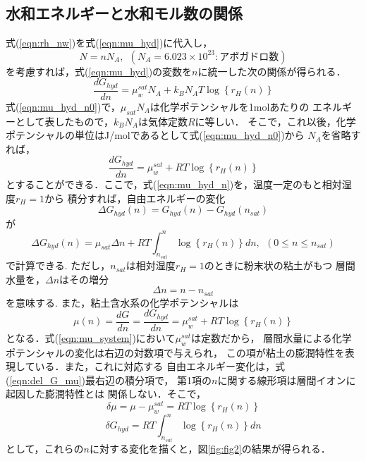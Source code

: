 \subsection{水和エネルギーと水和モル数の関係}
式(\ref{eqn:rh_nw})を式(\ref{eqn:mu_hyd})に代入し，
\begin{equation}
	N=nN_A, \ \ (N_A=6.023\times 10^{23}:アボガドロ数)
	\label{eqn:}
\end{equation}
を考慮すれば，式(\ref{eqn:mu_hyd})の変数を\(n\)に統一した次の関係が得られる．
\begin{equation}
	\frac{d G_{hyd}}{d n}
	=
	\mu_w^{sat}N_A +k_BN_AT \log \left\{ r_H(n) \right\}
	\label{eqn:mu_hyd_n0}
\end{equation}
式(\ref{eqn:mu_hyd_n0})で，\(\mu_{sat}N_A\)は化学ポテンシャルを1molあたりの
エネルギーとして表したもので，\(k_B N_A\)は気体定数\(R\)に等しい．
そこで，これ以後，化学ポテンシャルの単位はJ/molであるとして式(\ref{eqn:mu_hyd_n0})から
\(N_A\)を省略すれば，
\begin{equation}
	\frac{d G_{hyd}}{d n}
	=
	\mu_w^{sat} +RT \log \left\{ r_H(n) \right\}
	\label{eqn:mu_hyd_n}
\end{equation}
とすることができる．ここで，式(\ref{eqn:mu_hyd_n})を，温度一定のもと相対湿度$r_H=1$から
積分すれば，自由エネルギーの変化
\begin{equation}
	\Delta G_{hyd}(n) = G_{hyd}(n)-G_{hyd}(n_{sat})
	\label{eqn:del_G}
\end{equation}
が
\begin{equation}
	\Delta G_{hyd}(n)
	=
	\mu_{sat}\Delta n
	+
	RT
	\int_{n_{sat}}^{n} \log \left\{ r_H(n)\right\} dn, \ \ (0 \leq n \leq n_{sat})
	\label{eqn:del_G_mu}
\end{equation}
で計算できる. ただし，\(n_{sat}\)は相対湿度\(r_H=1\)のときに粉末状の粘土がもつ
層間水量を，\(\Delta n\)はその増分
\begin{equation}
	\Delta n = n-n_{sat}
\end{equation}
を意味する. また，粘土含水系の化学ポテンシャルは
\begin{equation}
	\mu(n)
	=
	\frac{d G}{d n}
	=
	\frac{d G_{hyd}}{d n}
	=
	\mu_w^{sat} +RT \log \left\{ r_H(n) \right\}
	\label{eqn:mu_system}
\end{equation}
となる．式(\ref{eqn:mu_system})において$\mu_w^{sat}$は定数だから，
層間水量による化学ポテンシャルの変化は右辺の対数項で与えられ，
この項が粘土の膨潤特性を表現している．また，これに対応する
自由エネルギー変化は，式(\ref{eqn:del_G_mu})最右辺の積分項で，
第1項の\(n\)に関する線形項は層間イオンに起因した膨潤特性とは
関係しない．そこで，
\begin{equation}
	\delta \mu = \mu-\mu_{w}^{sat}
	=
	RT \log \left\{ r_H(n)\right\}
\end{equation}
\begin{equation}
	\delta G_{hyd} =
	RT
	\int_{n_{sat}}^{n} \log \left\{ r_H(n)\right\} dn
\end{equation}
として，これらの\(n\)に対する変化を描くと，図\ref{fig:fig2}の結果が得られる．

